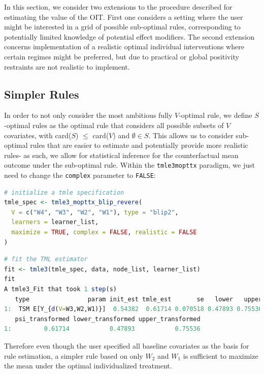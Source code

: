 \documentclass[12pt, krantz2,]{krantz}
\newcommand{\passthrough}[1]{#1}
\theoremstyle{definition}
\theoremstyle{definition}
\theoremstyle{definition}
\newcommand{\1}{\mathbbm{1}}
\begin{document}
In this section, we consider two extensions to the procedure described for
estimating the value of the OIT. First one considers a setting where the user
might be interested in a grid of possible sub-optimal rules, corresponding to
potentially limited knowledge of potential effect modifiers. The second
extension concerns implementation of a realistic optimal individual
interventions where certain regimes might be preferred, but due to practical or
global positivity restraints are not realistic to implement.

\hypertarget{simpler-rules}{%
\subsection{Simpler Rules}\label{simpler-rules}}

In order to not only consider the most ambitious fully \(V\)-optimal rule, we
define \(S\)-optimal rules as the optimal rule that considers all possible subsets
of \(V\) covariates, with card(\(S\)) \(\leq\) card(\(V\)) and \(\emptyset \in S\). This
allows us to consider sub-optimal rules that are easier to estimate and
potentially provide more realistic rules- as such, we allow for statistical
inference for the counterfactual mean outcome under the sub-optimal rule.
Within the \passthrough{\lstinline!tmle3mopttx!} paradigm, we just need to change the \passthrough{\lstinline!complex!}
parameter to \passthrough{\lstinline!FALSE!}:

\begin{lstlisting}[language=R]
# initialize a tmle specification
tmle_spec <- tmle3_mopttx_blip_revere(
  V = c("W4", "W3", "W2", "W1"), type = "blip2",
  learners = learner_list,
  maximize = TRUE, complex = FALSE, realistic = FALSE
)
\end{lstlisting}

\begin{lstlisting}[language=R]
# fit the TML estimator
fit <- tmle3(tmle_spec, data, node_list, learner_list)
fit
A tmle3_Fit that took 1 step(s)
   type                param init_est tmle_est       se   lower   upper
1:  TSM E[Y_{d(V=W3,W2,W1)}]  0.54382  0.61714 0.070518 0.47893 0.75536
   psi_transformed lower_transformed upper_transformed
1:         0.61714           0.47893           0.75536
\end{lstlisting}

Therefore even though the user specified all baseline covariates as the basis
for rule estimation, a simpler rule based on only \(W_2\) and \(W_1\) is sufficient
to maximize the mean under the optimal individualized treatment.
\end{document}
